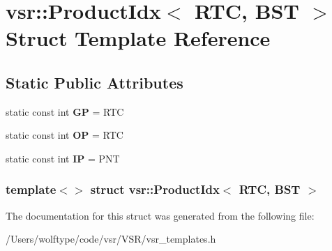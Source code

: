 \hypertarget{structvsr_1_1_product_idx_3_01_r_t_c_00_01_b_s_t_01_4}{\section{vsr\-:\-:Product\-Idx$<$ R\-T\-C, B\-S\-T $>$ Struct Template Reference}
\label{structvsr_1_1_product_idx_3_01_r_t_c_00_01_b_s_t_01_4}
}
\subsection*{Static Public Attributes}
\begin{DoxyCompactItemize}
\item 
\hypertarget{structvsr_1_1_product_idx_3_01_r_t_c_00_01_b_s_t_01_4_a643b857fba2ecd5774ed0f86689dd2d5}{static const int {\bfseries G\-P} = R\-T\-C}\label{structvsr_1_1_product_idx_3_01_r_t_c_00_01_b_s_t_01_4_a643b857fba2ecd5774ed0f86689dd2d5}

\item 
\hypertarget{structvsr_1_1_product_idx_3_01_r_t_c_00_01_b_s_t_01_4_a6b282870d1f90bb95d8bd2c04fe2e348}{static const int {\bfseries O\-P} = R\-T\-C}\label{structvsr_1_1_product_idx_3_01_r_t_c_00_01_b_s_t_01_4_a6b282870d1f90bb95d8bd2c04fe2e348}

\item 
\hypertarget{structvsr_1_1_product_idx_3_01_r_t_c_00_01_b_s_t_01_4_a83552f9a975c2cedeb4048f24a78a462}{static const int {\bfseries I\-P} = P\-N\-T}\label{structvsr_1_1_product_idx_3_01_r_t_c_00_01_b_s_t_01_4_a83552f9a975c2cedeb4048f24a78a462}

\end{DoxyCompactItemize}
\subsubsection*{template$<$$>$ struct vsr\-::\-Product\-Idx$<$ R\-T\-C, B\-S\-T $>$}



The documentation for this struct was generated from the following file\-:\begin{DoxyCompactItemize}
\item 
/\-Users/wolftype/code/vsr/\-V\-S\-R/vsr\-\_\-templates.\-h\end{DoxyCompactItemize}
